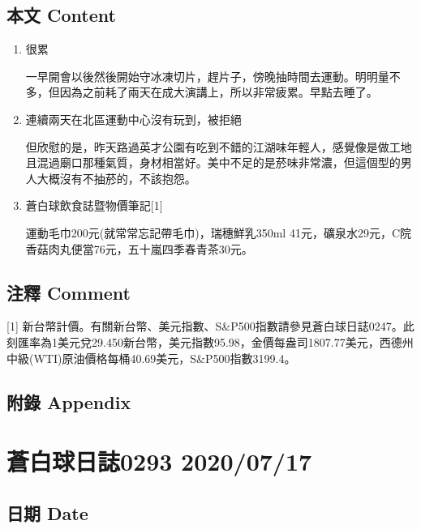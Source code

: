 \documentclass[a5paper, 11pt
]{book}
\begin{document}
\hypertarget{ux672cux6587-content-45}{%
\subsection{本文 Content}\label{ux672cux6587-content-45}}

\begin{enumerate}
\def\labelenumi{\arabic{enumi}.}
\item
  很累

  一早開會以後然後開始守冰凍切片，趕片子，傍晚抽時間去運動。明明量不多，但因為之前耗了兩天在成大演講上，所以非常疲累。早點去睡了。
\item
  連續兩天在北區運動中心沒有玩到，被拒絕

  但欣慰的是，昨天路過英才公園有吃到不錯的江湖味年輕人，感覺像是做工地且混過廟口那種氣質，身材相當好。美中不足的是菸味非常濃，但這個型的男人大概沒有不抽菸的，不該抱怨。
\item
  蒼白球飲食誌暨物價筆記{[}1{]}

  運動毛巾200元(就常常忘記帶毛巾)，瑞穗鮮乳350ml
  41元，礦泉水29元，C院香菇肉丸便當76元，五十嵐四季春青茶30元。
\end{enumerate}

\hypertarget{ux6ce8ux91cb-comment-45}{%
\subsection{注釋 Comment}\label{ux6ce8ux91cb-comment-45}}

{[}1{]}
新台幣計價。有關新台幣、美元指數、S\&P500指數請參見蒼白球日誌0247。此刻匯率為1美元兌29.450新台幣，美元指數95.98，金價每盎司1807.77美元，西德州中級(WTI)原油價格每桶40.69美元，S\&P500指數3199.4。

\hypertarget{ux9644ux9304-appendix-45}{%
\subsection{附錄 Appendix}\label{ux9644ux9304-appendix-45}}

\hypertarget{ux84bcux767dux7403ux65e5ux8a8c0293-20200717}{%
\section{蒼白球日誌0293
2020/07/17}\label{ux84bcux767dux7403ux65e5ux8a8c0293-20200717}}

\hypertarget{ux65e5ux671f-date-46}{%
\subsection{日期 Date}\label{ux65e5ux671f-date-46}}
\end{document}
